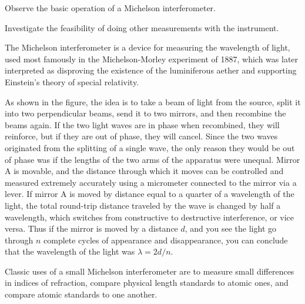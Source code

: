 \label{lab:michelson}

\apparatus
{}

\begin{goals}

\item[] Observe the basic operation of a Michelson interferometer.

\item[] Investigate the feasibility of doing other measurements with the instrument.

\end{goals}

\introduction

The Michelson interferometer is a device for measuring the wavelength of
light, used most famously in the Michelson-Morley experiment of 1887,
which was later interpreted as disproving the existence of the luminiferous
aether and supporting Einstein's theory of special relativity.


As shown in the figure, the idea is to take a beam of light from the source,
split it into two perpendicular beams, send it to two mirrors, and then recombine
the beams again. If the two light waves are in phase when recombined, they will
reinforce, but if they are out of phase, they will cancel. Since the two waves
originated from the splitting of a single wave, the only reason they would be out
of phase was if the lengths of the two arms of the apparatus were unequal. Mirror
A is movable, and the distance through which it moves can be controlled and measured
extremely accurately using a micrometer connected to the mirror via a lever.
If mirror A is moved by distance equal to a quarter of a wavelength of the light,
the total round-trip distance traveled by the wave is changed by half a wavelength,
which switches from constructive to destructive interference, or vice versa.
Thus if the mirror is moved by a distance $d$, and you see the light go through
$n$ complete cycles of appearance and disappearance, you can conclude that the
wavelength of the light was $\lambda=2d/n$.

Classic uses of a small Michelson interferometer are to measure small differences
in indices of refraction, compare physical length standards to atomic ones,
and compare atomic standards to one another.

